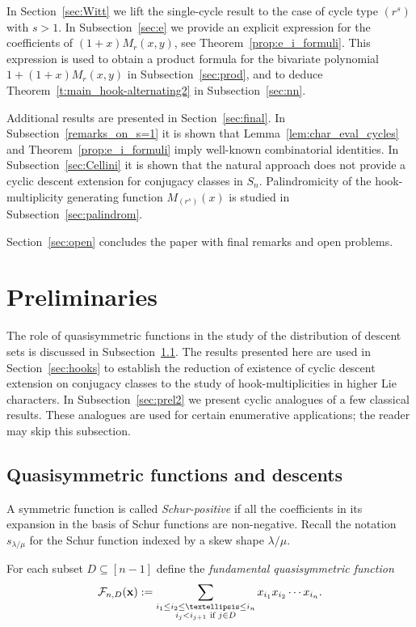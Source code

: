 \documentclass[ALCO,published]{cedram}
\newcommand{\f}{\mathcal F}
\begin{document}
In Section~\ref{sec:Witt} we lift the single-cycle result to the case of cycle type $(r^s)$ with $s>1$. 
In Subsection~\ref{sec:e} we provide an explicit expression for the coefficients of $(1+x)M_r(x,y)$, see Theorem~\ref{prop:e_i_formuli}.
This expression is used to obtain a product formula 
for the bivariate polynomial $1+(1+x)M_r(x,y)$
in Subsection~\ref{sec:prod}, 
and to deduce Theorem~\ref{t:main_hook-alternating2} in Subsection~\ref{sec:nn}. 

Additional results are presented in Section~\ref{sec:final}. 
In Subsection~\ref{remarks_on_s=1} it is shown that 
Lemma~\ref{lem:char_eval_cycles} and Theorem~\ref{prop:e_i_formuli} 
imply well-known combinatorial identities. 
In Subsection~\ref{sec:Cellini} it is shown that the natural approach does not provide a cyclic descent extension for conjugacy classes in $S_n$.
Palindromicity of the hook-multiplicity generating function $M_{(r^s)}(x)$ is studied in Subsection~\ref{sec:palindrom}. 

Section~\ref{sec:open} concludes the paper with final remarks and open problems.


\section{Preliminaries}\label{sec:background}
	

The role of quasisymmetric functions in the study of the distribution of descent 
sets is discussed in Subsection~\ref{sec:prel1}. 
The results presented here are 	used in Section~\ref{sec:hooks} 
to establish 
the reduction of existence of cyclic descent extension on conjugacy classes to the study of hook-multiplicities in higher Lie characters.
In Subsection~\ref{sec:prel2} we  
present cyclic analogues of a few classical results. These analogues are used for  
certain enumerative applications; the reader may skip this subsection.
	

\subsection{Quasisymmetric functions and descents}\label{sec:prel1} 

A symmetric function is called {\em Schur-positive} if all the
coefficients in its expansion in the basis of Schur functions are non-negative. Recall the notation 
$s_{\lambda/\mu}$ for the Schur function indexed by a skew shape $\lambda/\mu$. 
	
\begin{defn}\label{def:fundamental_QSF}
	For each subset $D \subseteq [n-1]$ define the {\em
		fundamental quasisymmetric function}
	\[
	   \f_{n,D}({\bf x}) := \sum_{\substack{i_1\le i_2 \le \ldots \le i_n \\ {i_j < i_{j+1} \text{ if } j \in D}}} 
	   x_{i_1} x_{i_2} \cdots x_{i_n}.
	\]
\end{defn}
 		
\end{document}
